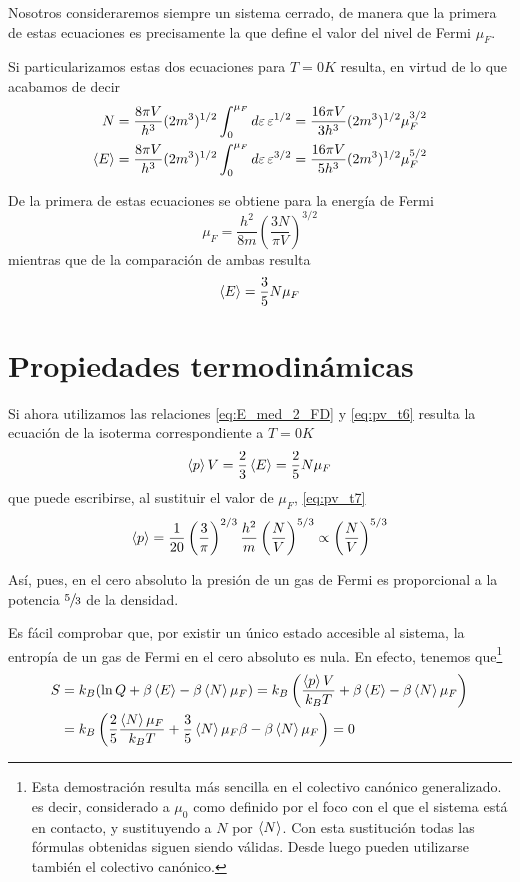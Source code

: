 Nosotros consideraremos siempre un sistema cerrado, de manera que la primera de estas ecuaciones es precisamente la que define el valor del nivel de Fermi $\mu_F$.

Si particularizamos estas dos ecuaciones para $T = 0 K$ resulta, en virtud de lo que acabamos de decir
\begin{align}
	N &= \frac{8\pi V}{h^3} (2m^3)^{1/2} \int_{0}^{\mu_F} \dd{\varepsilon} \varepsilon^{1/2} = \frac{16\pi V}{3h^3} (2m^3)^{1/2} \mu_F^{3/2}\\
	\expval{E} &=  \frac{8\pi V}{h^3} (2m^3)^{1/2} \int_{0}^{\mu_F} \dd{\varepsilon} \varepsilon^{3/2} = \frac{16\pi V}{5h^3} (2m^3)^{1/2} \mu_F^{5/2}
\end{align}

De la primera de estas ecuaciones se obtiene para la energía de Fermi
\begin{equation}
	\mu_F = \frac{h^2}{8m} \left( \frac{3N}{\pi V}\right)^{3/2}
\end{equation}
mientras que de la comparación de ambas resulta
\begin{equation}\label{eq:E_med_2_FD}
	\expval{E} = \frac{3}{5} N \mu_F
\end{equation}

\section{Propiedades termodinámicas}

Si ahora utilizamos las relaciones \eqref{eq:E_med_2_FD} y \eqref{eq:pv_t6} resulta la ecuación de la isoterma correspondiente a $T=0K$
\begin{equation}\label{eq:pv_t7}
	\expval{p}V = \frac{2}{3}\expval{E} = \frac{2}{5} N \mu_F
\end{equation}
que puede escribirse, al sustituir el valor de $\mu_F$, \eqref{eq:pv_t7}
\begin{equation}\label{eq:pv_2_t7}
	\expval{p} = \frac{1}{20} \left( \frac{3}{\pi} \right)^{2/3} \frac{h^2}{m} \left( \frac{N}{V} \right)^{5/3} \propto \left( \frac{N}{V} \right)^{5/3} 
\end{equation}

Así, pues, en el cero absoluto la presión de un gas de Fermi es proporcional a la potencia $\sfrac{5}{3}$ de la densidad.

Es fácil comprobar que, por existir un único estado accesible al sistema, la entropía de un gas de Fermi en el cero absoluto es nula.
En efecto, tenemos que\footnote{Esta demostración resulta más sencilla en el colectivo canónico generalizado. es decir, considerado a $\mu_0$ como definido por el foco con el que el sistema está en contacto, y sustituyendo a $N$ por $\expval{N}$. Con esta sustitución todas las fórmulas obtenidas siguen siendo válidas.
Desde luego pueden utilizarse también el colectivo canónico.}
\begin{align}
	S &= k_B(\ln Q + \beta \expval{E} - \beta \expval{N} \mu_F)= k_B \left( \frac{\expval{p}V}{k_B T} + \beta \expval{E} - \beta \expval{N} \mu_F \right) \nonumber \\
	  &= k_B \left( \frac{2}{5} \frac{\expval{N}\mu_F}{k_B T} + \frac{3}{5}\expval{N}\mu_F \beta - \beta \expval{N} \mu_F \right) = 0
\end{align}

